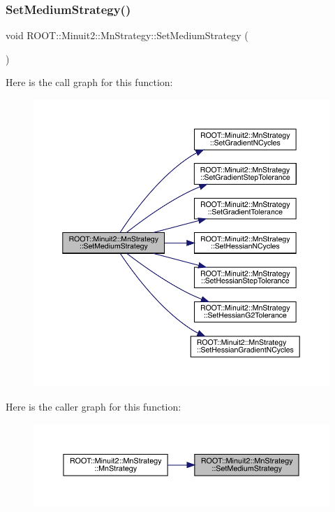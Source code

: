 \subsubsection{\texorpdfstring{SetMediumStrategy()}{SetMediumStrategy()}\hspace{0.1cm}{\footnotesize\ttfamily [1/2]}}
{\footnotesize\ttfamily void R\+O\+O\+T\+::\+Minuit2\+::\+Mn\+Strategy\+::\+Set\+Medium\+Strategy (\begin{DoxyParamCaption}{ }\end{DoxyParamCaption})}

Here is the call graph for this function\+:\nopagebreak
\begin{figure}[H]
\begin{center}
\leavevmode
\includegraphics[width=350pt]{da/de4/classROOT_1_1Minuit2_1_1MnStrategy_ae813d1aedcf6fa8f2bfb09a501a783f4_cgraph}
\end{center}
\end{figure}
Here is the caller graph for this function\+:\nopagebreak
\begin{figure}[H]
\begin{center}
\leavevmode
\includegraphics[width=350pt]{da/de4/classROOT_1_1Minuit2_1_1MnStrategy_ae813d1aedcf6fa8f2bfb09a501a783f4_icgraph}
\end{center}
\end{figure}
\mbox{\label{classROOT_1_1Minuit2_1_1MnStrategy_ae813d1aedcf6fa8f2bfb09a501a783f4}} 

